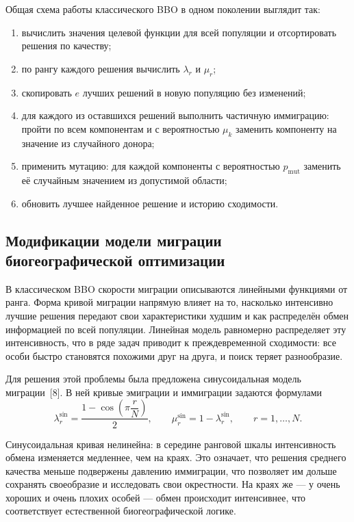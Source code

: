 \documentclass[14pt, russian]{scrartcl}
\begin{document}
Общая схема работы классического BBO в одном поколении выглядит так:
\begin{enumerate}
    \item вычислить значения целевой функции для всей популяции и
    отсортировать решения по качеству;
    \item по рангу каждого решения вычислить $\lambda_r$ и $\mu_r$;
    \item скопировать $e$ лучших решений в новую популяцию без изменений;
    \item для каждого из оставшихся решений выполнить частичную
    иммиграцию: пройти по всем компонентам и с вероятностью $\mu_k$
    заменить компоненту на значение из случайного донора;
    \item применить мутацию: для каждой компоненты с вероятностью
    $p_{\text{mut}}$ заменить её случайным значением из допустимой
    области;
    \item обновить лучшее найденное решение и историю сходимости.
\end{enumerate}

\subsection{Модификации модели миграции биогеографической оптимизации}

В классическом BBO скорости миграции описываются линейными функциями
от ранга. Форма кривой миграции напрямую влияет на то, насколько
интенсивно лучшие решения передают свои характеристики худшим и как
распределён обмен информацией по всей популяции. Линейная модель
равномерно распределяет эту интенсивность, что в ряде задач приводит к
преждевременной сходимости: все особи быстро становятся похожими
друг на друга, и поиск теряет разнообразие.

Для решения этой проблемы была предложена синусоидальная модель
миграции~[8]. В ней кривые эмиграции и иммиграции задаются формулами
\begin{equation}
    \lambda_r^{\text{sin}} =
        \frac{1 - \cos\!\left(\pi \dfrac{r}{N}\right)}{2},
    \qquad
    \mu_r^{\text{sin}} = 1 - \lambda_r^{\text{sin}},
    \qquad r = 1, \dots, N.
\end{equation}

Синусоидальная кривая нелинейна: в середине ранговой шкалы
интенсивность обмена изменяется медленнее, чем на краях. Это означает,
что решения среднего качества меньше подвержены давлению иммиграции,
что позволяет им дольше сохранять своеобразие и исследовать свои
окрестности. На краях же --- у очень хороших и очень плохих особей ---
обмен происходит интенсивнее, что соответствует естественной
биогеографической логике.
\end{document}
